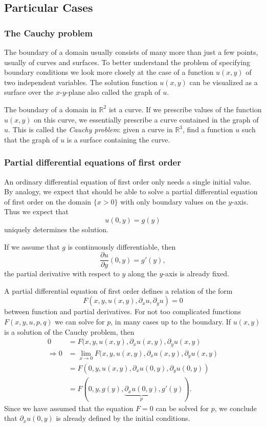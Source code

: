 \subsection{Particular Cases\label{klassifikation:randwerte-speziell}}
\subsubsection{The Cauchy problem\label{klassifikation:cauchy-problem}}
The boundary of a domain usually consists of many more than just a few
points, usually of curves and surfaces.
To better understand the problem of specifying boundary conditions
we look more closely at the case of a function $u(x,y)$ of two independent
variables.
The solution function $u(x,y)$ can be visualized as a surface over the
$x$-$y$-plane also called the graph of $u$.

The boundary of a domain in $\mathbb R^2$ ist a curve.
If we prescribe values of the function $u(x,y)$ on this curve, we
essentially prescribe a curve contained in the graph of $u$.
This is called the {\em Cauchy problem}: given a curve in $\mathbb R^3$, 
find a function $u$ such that the graph of $u$ is a surface containing
the curve.

\subsubsection{Partial differential equations of first order}
An ordinary differential equation of first order only needs a single
initial value.
By analogy, we expect that should be able to solve a partial differential
equation of first order on the domain $\{x>0\}$ with only boundary values
on the $y$-axis.
Thus we expect that 
\[
u(0,y)=g(y)
\]
uniquely determines the solution.

If we assume that $g$ is continuously differentiable,
then
\[
\frac{\partial u}{\partial y}(0, y)=g'(y),
\]
the partial derivative with respect to $y$ along the $y$-axis is already
fixed.

A partial differential equation of first order defines a relation
of the form
\[
F(x,y,u(x,y), \partial_x u, \partial_y u)=0
\]
between function and partial derivatives.
For not too complicated functions $F(x,y,u,p,q)$ we can solve for
$p$, in many cases up to the boundary.
If $u(x,y)$ is a solution of the Cauchy problem, then
\begin{align*}
0&=
F(x,y,u(x,y), \partial_x u(x,y), \partial_y u(x,y)
\\
\Rightarrow
0&=
\lim_{x\to 0}
F(x,y,u(x,y), \partial_x u(x,y), \partial_y u(x,y)\\
&=F(0,y,u(x,y),\partial_x u(0,y), \partial_y u(0,y))
\\
&=
F(0,y,g(y),\underbrace{\partial_x u(0,y)}_{\displaystyle p}, g'(y)).
\end{align*}
Since we have assumed that the equation $F=0$ can be solved 
for $p$, we conclude that 
$\partial_x u(0,y)$
is already defined by the initial conditions.

